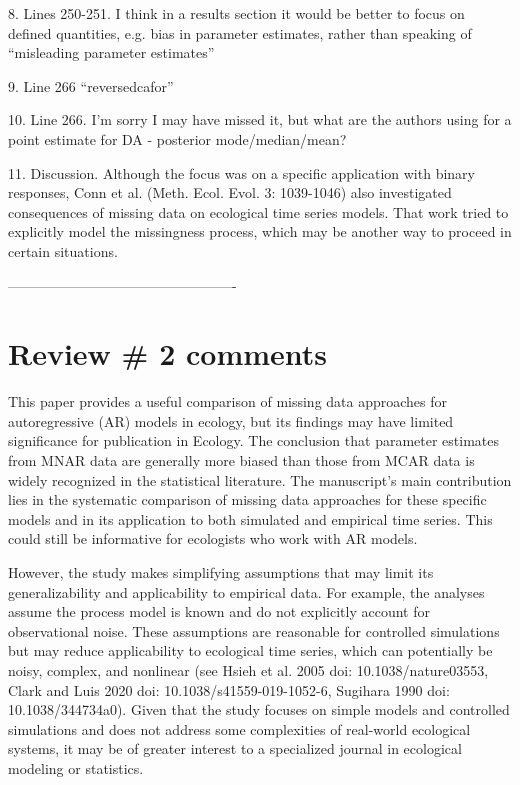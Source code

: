 \documentclass{article}
\begin{document}
8. Lines 250-251. I think in a results section it would be better to focus on defined quantities, e.g. bias in parameter estimates, rather than speaking of “misleading parameter estimates”

9. Line 266 “reversedcafor”

10. Line 266. I’m sorry I may have missed it, but what are the authors using for a point estimate for DA - posterior mode/median/mean?

11. Discussion. Although the focus was on a specific application with binary responses, Conn et al. (Meth. Ecol. Evol. 3: 1039-1046) also investigated consequences of missing data on ecological time series models. That work tried to explicitly model
the missingness process, which may be another way to proceed in certain situations.

-------------------------------------------------

\section{Review # 2 comments}

This paper provides a useful comparison of missing data approaches for autoregressive (AR) models in ecology, but its findings may have limited significance for publication in Ecology. The conclusion that parameter estimates from MNAR data are generally more biased than those from MCAR data is widely recognized in the statistical literature. The manuscript’s main contribution lies in the systematic comparison of missing data approaches for these specific models and in its application to both simulated and empirical time series. This could still be informative for ecologists who work with AR models.

However, the study makes simplifying assumptions that may limit its generalizability and applicability to empirical data. For example, the analyses assume the process model is known and do not explicitly account for observational noise. These assumptions are reasonable for controlled simulations but may reduce applicability to ecological time series, which can potentially be noisy, complex, and nonlinear (see Hsieh et al. 2005 doi: 10.1038/nature03553, Clark and Luis 2020 doi: 10.1038/s41559-019-1052-6, Sugihara 1990 doi: 10.1038/344734a0). Given that the study focuses on simple models and controlled simulations and does not address some complexities of real-world ecological systems, it may be of greater interest to a specialized journal in ecological modeling or statistics.
\end{document}
